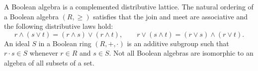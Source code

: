 A Boolean algebra is a complemented distributive lattice. The natural ordering of a Boolean algebra $(R, \geq)$ satisfies that the join and meet are associative and the following distributive laws hold:
$$r \wedge (s \vee t) = (r \wedge s) \vee (r \wedge t), \qquad r \vee (s \wedge t) = (r \vee s) \wedge (r \vee t).$$
An ideal $S$ in a Boolean ring $(R, +, \cdot)$ is an additive subgroup such that $r \cdot s \in S$ whenever $r \in R$ and $s \in S$. Not all Boolean algebras are isomorphic to an algebra of all subsets of a set.
